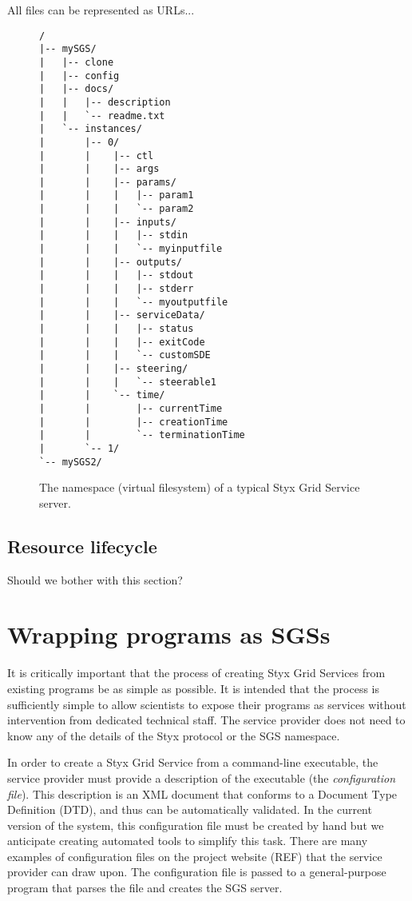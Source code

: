 \documentclass{llncs}
\begin{document}
All files can be represented as URLs...

\begin{figure}
\begin{verbatim}
/
|-- mySGS/
|   |-- clone
|   |-- config
|   |-- docs/
|   |   |-- description
|   |   `-- readme.txt
|   `-- instances/
|       |-- 0/
|       |    |-- ctl
|       |    |-- args
|       |    |-- params/
|       |    |   |-- param1
|       |    |   `-- param2
|       |    |-- inputs/
|       |    |   |-- stdin
|       |    |   `-- myinputfile
|       |    |-- outputs/
|       |    |   |-- stdout
|       |    |   |-- stderr
|       |    |   `-- myoutputfile
|       |    |-- serviceData/
|       |    |   |-- status
|       |    |   |-- exitCode
|       |    |   `-- customSDE
|       |    |-- steering/
|       |    |   `-- steerable1
|       |    `-- time/
|       |        |-- currentTime
|       |        |-- creationTime
|       |        `-- terminationTime
|       `-- 1/
`-- mySGS2/
\end{verbatim}
\caption{The namespace (virtual filesystem) of a typical Styx Grid Service server.}\label{fig:sgsnamespace}
\end{figure}

\subsection{Resource lifecycle}
Should we bother with this section?
%
\section{Wrapping programs as SGSs}
It is critically important that the process of creating Styx Grid Services from existing programs be as simple as possible.  It is intended that the process is sufficiently simple to allow scientists to expose their programs as services without intervention from dedicated technical staff.  The service provider does not need to know any of the details of the Styx protocol or the SGS namespace.

In order to create a Styx Grid Service from a command-line executable, the service provider must provide a description of the executable (the {\em configuration file\/}).  This description is an XML document that conforms to a Document Type Definition (DTD), and thus can be automatically validated.  In the current version of the system, this configuration file must be created by hand but we anticipate creating automated tools to simplify this task.  There are many examples of configuration files on the project website (REF) that the service provider can draw upon.  The configuration file is passed to a general-purpose program that parses the file and creates the SGS server.
\end{document}
